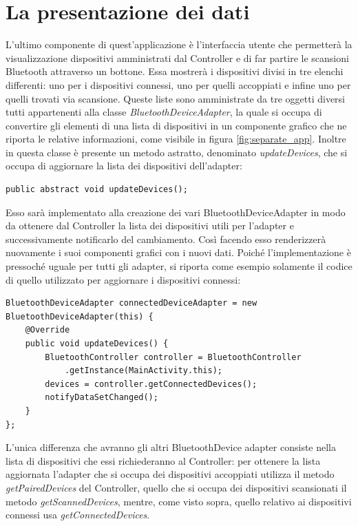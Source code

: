 \section{La presentazione dei dati}\label{ref:presentation}
L'ultimo componente di quest'applicazione è l'interfaccia utente che permetterà la visualizzazione dispositivi amministrati dal Controller e di far partire le scansioni Bluetooth attraverso un bottone. Essa mostrerà i dispositivi divisi in tre elenchi differenti: uno per i dispositivi connessi, uno per quelli accoppiati e infine uno per quelli trovati via scansione. Queste liste sono amministrate da tre oggetti diversi tutti appartenenti alla classe \textit{BluetoothDeviceAdapter}, la quale si occupa di convertire gli elementi di una lista di dispositivi in un componente grafico che ne riporta le relative informazioni, come visibile in figura \ref{fig:separate_app}.
Inoltre in questa classe è presente un metodo astratto, denominato \textit{updateDevices}, che si occupa di aggiornare la lista dei dispositivi dell'adapter:
\begin{verbatim}
public abstract void updateDevices();
\end{verbatim}
Esso sarà implementato alla creazione dei vari BluetoothDeviceAdapter in modo da ottenere dal Controller la lista dei dispositivi utili per l'adapter e successivamente notificarlo del cambiamento. Così facendo esso renderizzerà nuovamente i suoi componenti grafici con i nuovi dati. Poiché l'implementazione è pressoché uguale per tutti gli adapter, si riporta come esempio solamente il codice di quello utilizzato per aggiornare i dispositivi connessi:
\begin{verbatim}
BluetoothDeviceAdapter connectedDeviceAdapter = new BluetoothDeviceAdapter(this) {
    @Override
    public void updateDevices() {
        BluetoothController controller = BluetoothController
            .getInstance(MainActivity.this);
        devices = controller.getConnectedDevices();
        notifyDataSetChanged();
    }
};
\end{verbatim}
L'unica differenza che avranno gli altri BluetoothDevice adapter consiste nella lista di dispositivi che essi richiederanno al Controller: per ottenere la lista aggiornata l'adapter che si occupa dei dispositivi accoppiati utilizza il metodo \textit{getPairedDevices} del Controller, quello che si occupa dei dispositivi scansionati il metodo \textit{getScannedDevices}, mentre, come visto sopra, quello relativo ai dispositivi connessi usa \textit{getConnectedDevices}.


